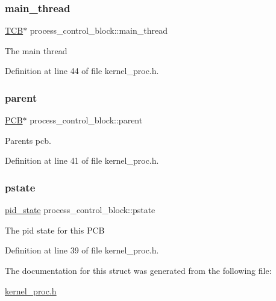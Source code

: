 \subsubsection{\texorpdfstring{main\+\_\+thread}{main\_thread}}
{\footnotesize\ttfamily \hyperlink{structthread__control__block}{T\+CB}$\ast$ process\+\_\+control\+\_\+block\+::main\+\_\+thread}

The main thread 

Definition at line 44 of file kernel\+\_\+proc.\+h.

\mbox{\label{structprocess__control__block_af20d0c36862c6def80024b4586ff8934}} 
\subsubsection{\texorpdfstring{parent}{parent}}
{\footnotesize\ttfamily \hyperlink{group__proc_gadf327f09ee935cf1734c14e8849f0421}{P\+CB}$\ast$ process\+\_\+control\+\_\+block\+::parent}

Parent\textquotesingle{}s pcb. 

Definition at line 41 of file kernel\+\_\+proc.\+h.

\mbox{\label{structprocess__control__block_ae3334dd8a5747f108124c7129c27eea5}} 
\subsubsection{\texorpdfstring{pstate}{pstate}}
{\footnotesize\ttfamily \hyperlink{group__proc_gade1eea4d20492c4c97263201145e5097}{pid\+\_\+state} process\+\_\+control\+\_\+block\+::pstate}

The pid state for this P\+CB 

Definition at line 39 of file kernel\+\_\+proc.\+h.



The documentation for this struct was generated from the following file\+:\begin{DoxyCompactItemize}
\item 
\hyperlink{kernel__proc_8h}{kernel\+\_\+proc.\+h}\end{DoxyCompactItemize}
